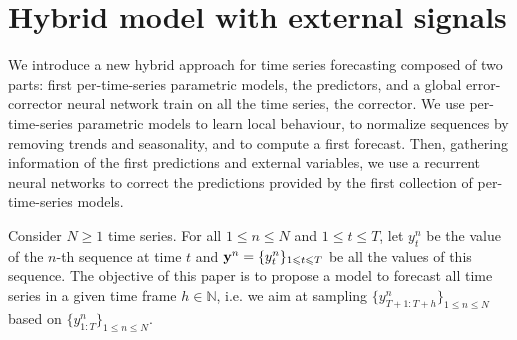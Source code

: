\documentclass{article} %
\newcommand{\ts}{y}
\newcommand{\fullts}{{\bf \ts}}
\newcommand{\lag}{h}
\begin{document}
\section{Hybrid model with external signals}
\label{sec:hybrid}
We introduce a new hybrid approach for time series forecasting  composed of two parts: first per-time-series parametric models, the predictors, and a global error-corrector neural network train on all the time series, the corrector. We use  per-time-series parametric models to learn local behaviour, to normalize sequences by removing trends and seasonality,  and to compute a first forecast. Then, gathering information of the first predictions and external variables, we use a recurrent neural networks to correct the predictions provided by the first collection of per-time-series models.

Consider $N\geqslant 1$ time series. For all $1\leqslant n \leqslant N$ and $1\leqslant t \leqslant T$, let $\ts_t^n$ be the value of the $n$-th sequence at time $t$ and  $\fullts^n = \{\ts_t^n\}_{1\leqslant t \leqslant T}$ be all the values of this sequence.   The objective of this paper is to propose a model to  forecast all time series in a given time frame  $\lag \in \mathbb{N}$, i.e. we aim at sampling $\{\ts^n_{T+1:T+\lag}\}_{1\leqslant n \leqslant N}$ based on $\{\ts^n_{1:T}\}_{1\leqslant n \leqslant N}$.

\end{document}
